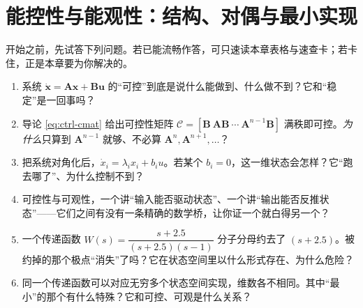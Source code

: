 \chapter{能控性与能观性：结构、对偶与最小实现}
\label{ch:controllability-obsv}


\begin{practice}[前置自测]
开始之前，先试答下列问题。若已能流畅作答，可只速读本章表格与速查卡；若卡住，正是本章要为你解决的。
\begin{enumerate}
  \item 系统 $\dot{\mathbf{x}}=\mathbf{A}\mathbf{x}+\mathbf{B}\mathbf{u}$ 的“可控”到底是说什么能做到、什么做不到？它和“稳定”是一回事吗？
  \item 导论 \cref{eq:ctrl-cmat} 给出可控性矩阵 $\mathcal{C}=[\mathbf{B}\ \mathbf{A}\mathbf{B}\ \cdots\ \mathbf{A}^{n-1}\mathbf{B}]$ 满秩即可控。\emph{为什么}只算到 $\mathbf{A}^{n-1}$ 就够、不必算 $\mathbf{A}^n,\mathbf{A}^{n+1},\dots$？
  \item 把系统对角化后，$\dot{x}_i=\lambda_i x_i+b_i u$。若某个 $b_i=0$，这一维状态会怎样？它“跑去哪了”、为什么控制不到？
  \item 可控性与可观性，一个讲“输入能否驱动状态”、一个讲“输出能否反推状态”——它们之间有没有一条精确的数学桥，让你证一个就白得另一个？
  \item 一个传递函数 $W(s)=\dfrac{s+2.5}{(s+2.5)(s-1)}$ 分子分母约去了 $(s+2.5)$。被约掉的那个极点“消失”了吗？它在状态空间里以什么形式存在、为什么危险？
  \item 同一个传递函数可以对应无穷多个状态空间实现，维数各不相同。其中“最小”的那个有什么特殊？它和可控、可观是什么关系？
\end{enumerate}
\end{practice}

